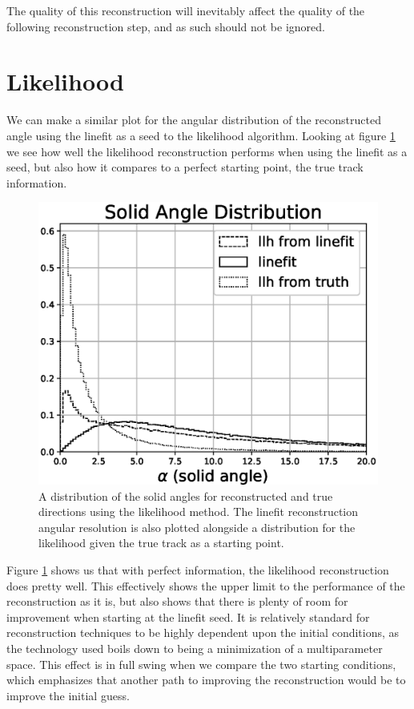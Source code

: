 The quality of this reconstruction will inevitably affect the quality of the following reconstruction step, and as such should not be ignored. 

\section{Likelihood}

We can make a similar plot for the angular distribution of the reconstructed angle using the linefit as a seed to the likelihood algorithm. Looking at figure \ref{fig:alpha_llh} we see how well the likelihood reconstruction performs when using the linefit as a seed, but also how it compares to a perfect starting point, the true track information.

\begin{figure}[H]
  \centering
  \includegraphics[width=12cm]{./Figures/reco_plots/alpha_dist_llh_norm.eps}
  \caption{A distribution of the solid angles for reconstructed and true directions using the likelihood method. The linefit reconstruction angular resolution is also plotted alongside a distribution for the likelihood given the true track as a starting point.}
  \label{fig:alpha_llh}
\end{figure}

Figure \ref{fig:alpha_llh} shows us that with perfect information, the likelihood reconstruction does pretty well. This effectively shows the upper limit to the performance of the reconstruction as it is, but also shows that there is plenty of room for improvement when starting at the linefit seed. It is relatively standard for reconstruction techniques to be highly dependent upon the initial conditions, as the technology used boils down to being a minimization of a multiparameter space. This effect is in full swing when we compare the two starting conditions, which emphasizes that another path to improving the reconstruction would be to improve the initial guess.

